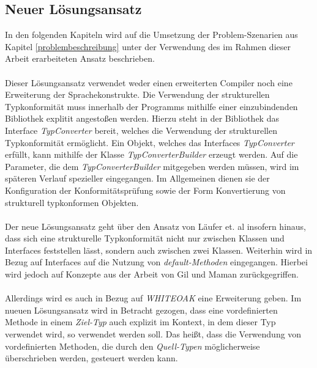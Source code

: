 \documentclass[11pt, 
ngerman,
doublespacing,
chapterinoneline, %
consistentlayout, %
]{scrartcl}
\begin{document}
\subsection{Neuer Lösungsansatz}
In den folgenden Kapiteln wird auf die Umsetzung der Problem-Szenarien aus Kapitel \ref{problembeschreibung} unter der Verwendung des im Rahmen dieser Arbeit erarbeiteten Ansatz beschrieben.\\\\
Dieser Lösungsansatz verwendet weder einen erweiterten Compiler noch eine Erweiterung der Sprachekonstrukte. Die Verwendung der strukturellen Typkonformität muss innerhalb der Programms mithilfe einer einzubindenden Bibliothek explitit angestoßen werden. Hierzu steht in der Bibliothek das Interface \emph{TypConverter} bereit, welches die Verwendung der strukturellen Typkonformität ermöglicht. Ein Objekt, welches das Interfaces \emph{TypConverter}  erfüllt, kann mithilfe der Klasse \emph{TypConverterBuilder} erzeugt werden. Auf die Parameter, die dem \emph{TypConverterBuilder} mitgegeben werden müssen, wird im späteren Verlauf spezieller eingegangen. Im Allgemeinen dienen sie der Konfiguration der Konformitätsprüfung sowie der Form Konvertierung von strukturell typkonformen Objekten.\\\\
Der neue Lösungsansatz geht über den Ansatz von Läufer et. al \cite{structconfjava} insofern hinaus, dass sich eine strukturelle Typkonformität nicht nur zwischen Klassen und Interfaces feststellen lässt, sondern auch zwischen zwei Klassen. Weiterhin wird in Bezug auf Interfaces auf die Nutzung von \emph{default-Methoden} eingegangen. Hierbei wird jedoch auf Konzepte aus der Arbeit von Gil und Maman \cite{whiteoak} zurückgegriffen.\\\\
Allerdings wird es auch in Bezug auf \emph{WHITEOAK} eine Erweiterung geben. Im nueuen Lösungsansatz wird in Betracht gezogen, dass eine vordefinierten Methode in einem \emph{Ziel-Typ} auch explizit im Kontext, in dem dieser Typ verwendet wird, so verwendet werden soll. Das heißt, dass die Verwendung von vordefinierten Methoden, die durch den \emph{Quell-Typen} möglicherweise überschrieben werden, gesteuert werden kann.
\end{document}
